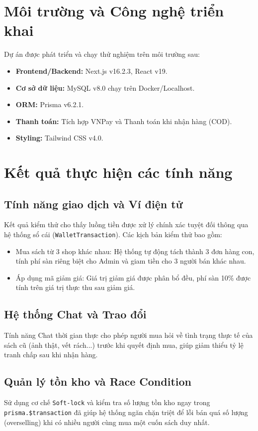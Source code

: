 \documentclass[../main.tex]{subfiles}
\begin{document}
\section{Môi trường và Công nghệ triển khai}
Dự án được phát triển và chạy thử nghiệm trên môi trường sau:
\begin{itemize}
    \item \textbf{Frontend/Backend:} Next.js v16.2.3, React v19.
    \item \textbf{Cơ sở dữ liệu:} MySQL v8.0 chạy trên Docker/Localhost.
    \item \textbf{ORM:} Prisma v6.2.1.
    \item \textbf{Thanh toán:} Tích hợp VNPay và Thanh toán khi nhận hàng (COD).
    \item \textbf{Styling:} Tailwind CSS v4.0.
\end{itemize}

\section{Kết quả thực hiện các tính năng}

\subsection{Tính năng giao dịch và Ví điện tử}
Kết quả kiểm thử cho thấy luồng tiền được xử lý chính xác tuyệt đối thông qua hệ thống sổ cái (\texttt{WalletTransaction}). Các kịch bản kiểm thử bao gồm:
\begin{itemize}
    \item Mua sách từ 3 shop khác nhau: Hệ thống tự động tách thành 3 đơn hàng con, tính phí sàn riêng biệt cho Admin và giam tiền cho 3 người bán khác nhau.
    \item Áp dụng mã giảm giá: Giá trị giảm giá được phân bổ đều, phí sàn 10\% được tính trên giá trị thực thu sau giảm giá.
\end{itemize}

\subsection{Hệ thống Chat và Trao đổi}
Tính năng Chat thời gian thực cho phép người mua hỏi về tình trạng thực tế của sách cũ (ảnh thật, vết rách...) trước khi quyết định mua, giúp giảm thiểu tỷ lệ tranh chấp sau khi nhận hàng.

\subsection{Quản lý tồn kho và Race Condition}
Sử dụng cơ chế \texttt{Soft-lock} và kiểm tra số lượng tồn kho ngay trong \texttt{prisma.\$transaction} đã giúp hệ thống ngăn chặn triệt để lỗi bán quá số lượng (overselling) khi có nhiều người cùng mua một cuốn sách duy nhất.
\end{document}
